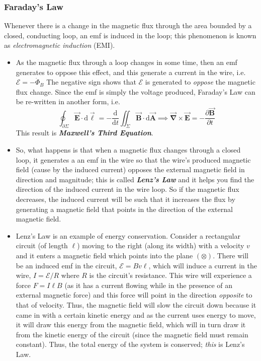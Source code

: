 \documentclass{scrartcl}
\begin{document}
    \subsubsection{Faraday's Law}\newline
    Whenever there is a change in the magnetic flux through the area bounded by a closed, conducting loop, an emf is induced in the loop; this phenomenon is known as \textit{electromagnetic induction} (EMI).
    \begin{itemize}
        \item As the magnetic flux through a loop changes in some time, then an emf generates to oppose this effect, and this generate a current in the wire, i.e. $\boxed{\mathcal E=-\dot\Phi_B}$ The negative sign shows that $\mathcal E$ is generated to \textit{oppose} the magnetic flux change. Since the emf is simply the voltage produced, Faraday's Law can be re-written in another form, i.e. \[\boxed{\oint_{\partial\Sigma}\vec{\mathbf E}\cdot\mathrm d\vec{\mathbf \ell}=-\frac{\mathrm d}{\mathrm dt}\iint_\Sigma\vec{\mathbf B}\cdot\mathrm d\vec{\mathbf A}}\implies\boxed{\vec{\mathbf\nabla}\times\vec{\mathbf E}=-\frac{\partial\vec{\mathbf B}}{\partial t}}\] This result is \textbf{\textit{Maxwell's Third Equation}}.
        \item So, what happens is that when a magnetic flux changes through a closed loop, it generates a an emf in the wire so that the wire's produced magnetic field (cause by the induced current) opposes the external magnetic field in direction and magnitude; this is called \textbf{\textit{Lenz's Law}} and it helps you find the direction of the induced current in the wire loop. So if the magnetic flux decreases, the induced current will be such that it increases the flux by generating a magnetic field that points in the direction of the external magnetic field.
        \item Lenz's Law is an example of energy conservation. Consider a rectangular circuit (of length $\ell$) moving to the right (along its width) with a velocity $v$ and it enters a magnetic field which points into the plane $\left(\otimes\right)$. There will be an induced emf in the circuit, $\mathcal E=Bv\ell$, which will induce a current in the wire, $I=\mathcal E/R$ where $R$ is the circuit's resistance. This wire will experience a force $F=I\ell B$ (as it has a current flowing while in the presence of an external magnetic force) and this force will point in the direction \textit{opposite} to that of velocity. Thus, the magnetic field will slow the circuit down because it came in with a certain kinetic energy and as the current uses energy to move, it will draw this energy from the magnetic field, which will in turn draw it from the kinetic energy of the circuit (since the magnetic field must remain constant). Thus, the total energy of the system is conserved; \textit{this} is Lenz's Law.

\end{itemize}
\end{document}
